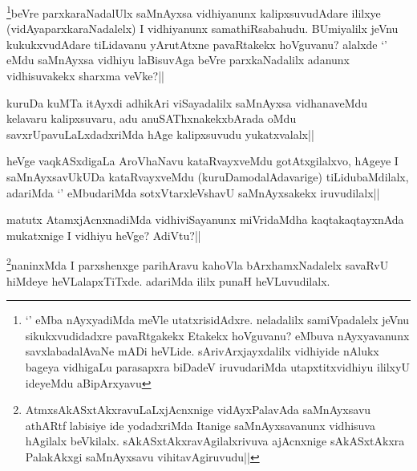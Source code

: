 \begin{artha}
\footnote{`\stext' eMba nAyxyadiMda meVle utatxrisidAdxre. neladalilx samiVpadalelx jeVnu sikukxvudidadxre pavaRtgakekx Etakekx hoVguvanu? eMbuva nAyxyavanunx savxlabadalAvaNe mADi heVLide. sArivArxjayxdalilx vidhiyide nAlukx bageya vidhigaLu parasapxra biDadeV iruvudariMda utapxtitxvidhiyu ililxyU ideyeMdu aBipArxyavu}beVre parxkaraNadalUlx saMnAyxsa vidhiyanunx kalipxsuvudAdare ililxye (vidAyaparxkaraNadalelx) I vidhiyanunx samathiRsabahudu. BUmiyalilx jeVnu kukukxvudAdare tiLidavanu yArutAtxne pavaRtakekx hoVguvanu? alalxde `\stext' eMdu saMnAyxsa vidhiyu laBisuvAga beVre parxkaNadalilx adanunx vidhisuvakekx sharxma veVke?||
\end{artha}


\begin{artha}
kuruDa kuMTa itAyxdi adhikAri viSayadalilx saMnAyxsa vidhanaveMdu kelavaru kalipxsuvaru, adu anuSAThxnakekxbArada oMdu savxrUpavuLaLxdadxriMda hAge kalipxsuvudu yukatxvalalx||
\end{artha}


\begin{artha}
heVge vaqkASxdigaLa AroVhaNavu kataRvayxveMdu gotAtxgilalxvo, hAgeye I saMnAyxsavUkUDa kataRvayxveMdu (kuruDamodalAdavarige) tiLidubaMdilalx, adariMda `\stext' eMbudariMda sotxVtarxleVshavU saMnAyxsakekx iruvudilalx||
\end{artha}


\begin{artha}
matutx AtamxjAcnxnadiMda vidhiviSayanunx miVridaMdha kaqtakaqtayxnAda mukatxnige I vidhiyu heVge? AdiVtu?||
\end{artha}

\begin{artha}
\footnote{AtmxsAkASxtAkxravuLaLxjAcnxnige vidAyxPalavAda saMnAyxsavu athARtf labisiye ide yodadxriMda Itanige saMnAyxsavanunx vidhisuva hAgilalx beVkilalx. sAkASxtAkxravAgilalxrivuva ajAcnxnige sAkASxtAkxra PalakAkxgi saMnAyxsavu vihitavAgiruvudu||}naninxMda I parxshenxge parihAravu kahoVla bArxhamxNadalelx savaRvU hiMdeye heVLalapxTiTxde. adariMda ililx punaH heVLuvudilalx.
\end{artha}

